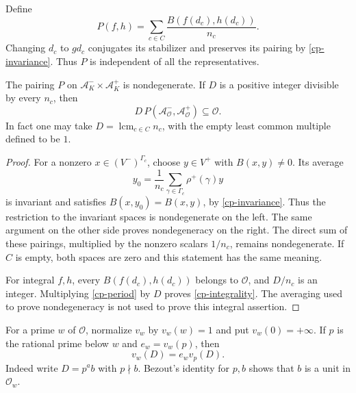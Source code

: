Define
\begin{equation}\label{cp-period}
              P(f,h)=\sum_{c\in C}\frac{B(f(d_c),h(d_c))}{n_c}.
\end{equation}
Changing $d_c$ to $gd_c$ conjugates its stabilizer and preserves
its pairing by \eqref{cp-invariance}. Thus $P$ is independent
of all the representatives.

\begin{proposition}\label{cp-nondegenerate}
The pairing $P$ on $\mathcal A^-_K\times\mathcal A^+_K$
is nondegenerate. If $D$ is a positive integer divisible by
every $n_c$, then
\begin{equation}\label{cp-integrality}
       D\,P(\mathcal A^-_{\mathcal O},
                         \mathcal A^+_{\mathcal O})\subseteq\mathcal O.
\end{equation}
In fact one may take $D=\operatorname{lcm}_{c\in C}n_c$,
with the empty least common multiple defined to be $1$.
\end{proposition}
\begin{proof}
For a nonzero $x\in(V^-)^{\Gamma_c}$, choose $y\in V^+$
with $B(x,y)\ne0$. Its average
\[
                  y_0=\frac1{n_c}\sum_{\gamma\in\Gamma_c}
                                                       \rho^+(\gamma)y
\]
is invariant and satisfies $B(x,y_0)=B(x,y)$, by
\eqref{cp-invariance}. Thus the restriction to the invariant
spaces is nondegenerate on the left. The same argument on
the other side proves nondegeneracy on the right.
The direct sum of these pairings, multiplied by the nonzero
scalars $1/n_c$, remains nondegenerate. If $C$ is empty,
both spaces are zero and this statement has the same meaning.

For integral $f,h$, every $B(f(d_c),h(d_c))$ belongs to
$\mathcal O$, and $D/n_c$ is an integer. Multiplying
\eqref{cp-period} by $D$ proves \eqref{cp-integrality}.
The averaging used to prove nondegeneracy is not used to
prove this integral assertion.
\end{proof}

For a prime $w$ of $\mathcal O$, normalize $v_w$ by
$v_w(w)=1$ and put $v_w(0)=+\infty$. If $p$ is the
rational prime below $w$ and $e_w=v_w(p)$, then
\begin{equation}\label{cp-nat-valuation}
                        v_w(D)=e_w v_p(D).
\end{equation}
Indeed write $D=p^a b$ with $p\nmid b$. Bezout's identity
for $p,b$ shows that $b$ is a unit in $\mathcal O_w$.

